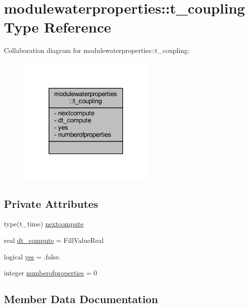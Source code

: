 \hypertarget{structmodulewaterproperties_1_1t__coupling}{}\section{modulewaterproperties\+:\+:t\+\_\+coupling Type Reference}
\label{structmodulewaterproperties_1_1t__coupling}


Collaboration diagram for modulewaterproperties\+:\+:t\+\_\+coupling\+:\nopagebreak
\begin{figure}[H]
\begin{center}
\leavevmode
\includegraphics[width=194pt]{structmodulewaterproperties_1_1t__coupling__coll__graph}
\end{center}
\end{figure}
\subsection*{Private Attributes}
\begin{DoxyCompactItemize}
\item 
type(t\+\_\+time) \mbox{\hyperlink{structmodulewaterproperties_1_1t__coupling_a112823e86810d9f058404e7cd9c6a8c5}{nextcompute}}
\item 
real \mbox{\hyperlink{structmodulewaterproperties_1_1t__coupling_ac9acd1251ee048af8f4eca96010456d2}{dt\+\_\+compute}} = Fill\+Value\+Real
\item 
logical \mbox{\hyperlink{structmodulewaterproperties_1_1t__coupling_a8bca550e0d9d015b395450df490ac4b7}{yes}} = .false.
\item 
integer \mbox{\hyperlink{structmodulewaterproperties_1_1t__coupling_aad5159d89fb4d282d2027f5f98471823}{numberofproperties}} = 0
\end{DoxyCompactItemize}


\subsection{Member Data Documentation}
\mbox{\label{structmodulewaterproperties_1_1t__coupling_ac9acd1251ee048af8f4eca96010456d2}} 

